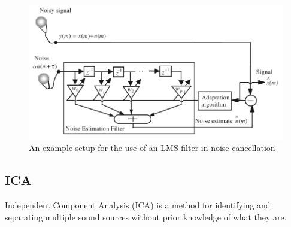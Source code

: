 \begin{figure}[H]
	\centering
	\includegraphics[width=\textwidth]{./img/lmsfilter.png}
	\caption{An example setup for the use of an LMS filter in noise cancellation \cite{AdvancedDSPing}}
	\label{fig:lmsfilter}
\end{figure}

\subsection{ICA}
Independent Component Analysis (ICA) is a method for identifying and separating multiple sound sources without prior knowledge of what they are.
